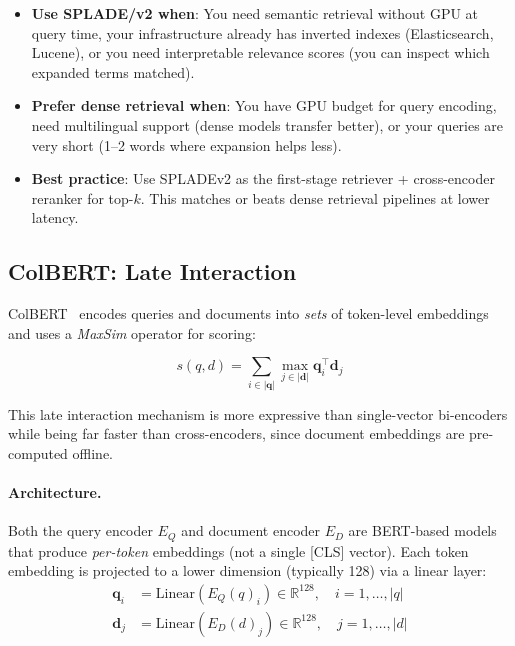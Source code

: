 \begin{intuitionbox}
\begin{itemize}
  \item \textbf{Use SPLADE/v2 when}: You need semantic retrieval without GPU at query time, your infrastructure already has inverted indexes (Elasticsearch, Lucene), or you need interpretable relevance scores (you can inspect which expanded terms matched).
  \item \textbf{Prefer dense retrieval when}: You have GPU budget for query encoding, need multilingual support (dense models transfer better), or your queries are very short (1--2 words where expansion helps less).
  \item \textbf{Best practice}: Use SPLADEv2 as the first-stage retriever + cross-encoder reranker for top-$k$. This matches or beats dense retrieval pipelines at lower latency.
\end{itemize}
\end{intuitionbox}

\subsection{ColBERT: Late Interaction}
\label{colbert-late-interaction}

ColBERT~\cite{khattab2020colbert} encodes queries and documents into \emph{sets} of token-level embeddings and uses a \emph{MaxSim} operator for scoring:

\begin{equation}
  s(q, d) = \sum_{i \in |\mathbf{q}|} \max_{j \in |\mathbf{d}|} \mathbf{q}_i^\top \mathbf{d}_j
\label{eq:colbert}
\end{equation}

This late interaction mechanism is more expressive than single-vector bi-encoders while being far faster than cross-encoders, since document embeddings are pre-computed offline.

\paragraph{Architecture.}
\label{architecture.-1}

Both the query encoder $E_Q$ and document encoder $E_D$ are BERT-based models that produce \emph{per-token} embeddings (not a single [CLS] vector). Each token embedding is projected to a lower dimension (typically 128) via a linear layer: 
\begin{align}
  \mathbf{q}_i &= \text{Linear}(E_Q(q)_i) \in \mathbb{R}^{128}, \quad i = 1, \ldots, |q| \\
  \mathbf{d}_j &= \text{Linear}(E_D(d)_j) \in \mathbb{R}^{128}, \quad j = 1, \ldots, |d|
\end{align}

